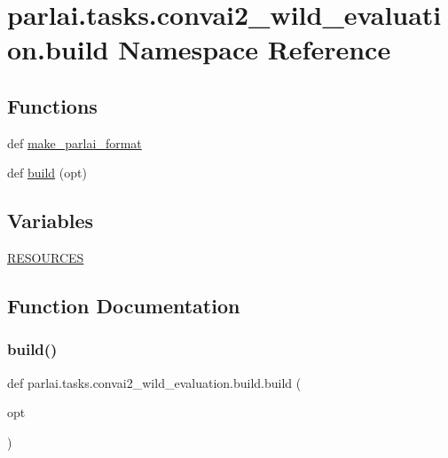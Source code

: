 \hypertarget{namespaceparlai_1_1tasks_1_1convai2__wild__evaluation_1_1build}{}\section{parlai.\+tasks.\+convai2\+\_\+wild\+\_\+evaluation.\+build Namespace Reference}
\label{namespaceparlai_1_1tasks_1_1convai2__wild__evaluation_1_1build}
\subsection*{Functions}
\begin{DoxyCompactItemize}
\item 
def \hyperlink{namespaceparlai_1_1tasks_1_1convai2__wild__evaluation_1_1build_a6c2b84806e2cb18c6eedb72d161dec5e}{make\+\_\+parlai\+\_\+format}
\item 
def \hyperlink{namespaceparlai_1_1tasks_1_1convai2__wild__evaluation_1_1build_a7f46320f8766498ee5f87f68e24da31b}{build} (opt)
\end{DoxyCompactItemize}
\subsection*{Variables}
\begin{DoxyCompactItemize}
\item 
\hyperlink{namespaceparlai_1_1tasks_1_1convai2__wild__evaluation_1_1build_aec445685ba4d77fbe9b8ad4cdc90cbab}{R\+E\+S\+O\+U\+R\+C\+ES}
\end{DoxyCompactItemize}


\subsection{Function Documentation}
\mbox{\label{namespaceparlai_1_1tasks_1_1convai2__wild__evaluation_1_1build_a7f46320f8766498ee5f87f68e24da31b}} 
\subsubsection{\texorpdfstring{build()}{build()}}
{\footnotesize\ttfamily def parlai.\+tasks.\+convai2\+\_\+wild\+\_\+evaluation.\+build.\+build (\begin{DoxyParamCaption}\item[{}]{opt }\end{DoxyParamCaption})}



